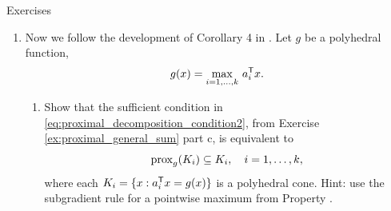 \begin{xcb}{Exercises}
\begin{enumerate}[label=\thechapter.\arabic*]
\begin{enumerate}[label=\alph*.]
\item First show that, for any $x$, the point $\prox_f(\prox_g(x))$ satisfies  
  \[
  0 \in \prox_f(\prox_g(x)) - x + \partial g(\prox_g(x)) + 
  \partial f \big( \prox_f(\prox_g(x)) \big).
  \]
  Hint: use the proximal subgradient characterization
  \eqref{eq:proximal_subgradient_characterization} for $\prox_f(\prox_g(x))$, 
  as well as for $\prox_g(x)$, and add these two expressions together. 

\item Assume that 
  \begin{equation}
  \label{eq:proximal_decomposition_condition1}
  \partial g(x) \subseteq \partial g(\prox_f(x)), \quad \text{for all $x$}. 
  \end{equation}
  Show that, for any $x$, the point $\prox_f(\prox_g(x))$ must then satisfy   
  \[
  0 \in \prox_f(\prox_g(x)) - x + \partial g \big( \prox_f(\prox_g(x)) \big) +  
  \partial f \big( \prox_f(\prox_g(x)) \big).
  \]
  Hint: use part a. Conclude using the subgradient characterization for
  $\prox_{f+g}(x)$ and single-valuedness of the proximal map that
  $\prox_{f+g}(x) = \prox_f(\prox_g(x))$, and as $x$ was arbitrary,
  $\prox_{f+g} =  \prox_f \circ \prox_g$.   

\item Let , with each $g_i$ closed and convex, 
  and . Prove that
  \eqref{eq:proximal_decomposition_condition1} is implied by
  \begin{equation}
  \label{eq:proximal_decomposition_condition2}
  \partial g_i(x) \subseteq \partial g_i(\prox_f(x)), \quad \text{for all $x$, 
    and $i=1,\dots,k$},  
  \end{equation}
  and thus the latter is a sufficient condition for $\prox_{f+g} =  \prox_f \circ
  \prox_g$. 
\end{enumerate}

\item \label{ex:generalized_tv_proximal_mapping}
  Now we follow the development of Corollary 4 in \cite{yu2013decomposing}. Let
  $g$ be a polyhedral function, 
  \[
  g(x) = \max_{i=1,\dots,k} \, a_i^{\mathsf{T}} x.
  \]
  
\begin{enumerate}[label=\alph*.]
\item Show that the sufficient condition in
  \eqref{eq:proximal_decomposition_condition2}, from Exercise
  \ref{ex:proximal_general_sum} part c, is equivalent to  
  \[
  \operatorname{prox}_g(K_i) \subseteq K_i, \quad i=1,\dots,k,
  \]
  where each $K_i = \{x : a_i^{\mathsf{T}} x = g(x)\}$ is a polyhedral cone. Hint: use the
  subgradient rule for a pointwise maximum from Property
  .   


\end{enumerate}
\end{enumerate}
\end{xcb}

